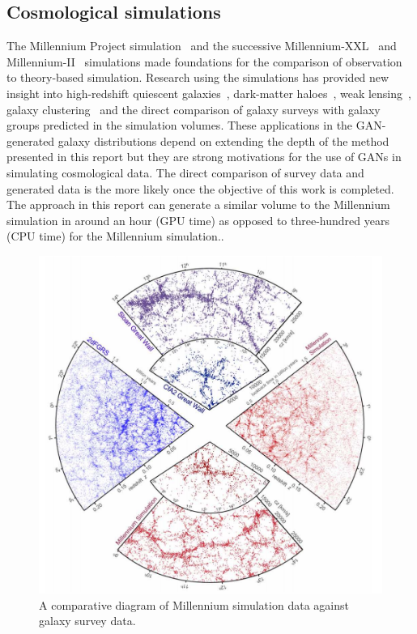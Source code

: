 \documentclass[twocolumn]{article}
\numberwithin{equation}{section}
\begin{document}
\subsection{Cosmological simulations}
The Millennium Project simulation~\cite{millsim} and the successive Millennium-XXL~\cite{millxxlsim} and 
Millennium-II~\cite{mill2sim} simulations made foundations for the comparison of observation to theory-based simulation. 
Research using the simulations has provided new insight into high-redshift quiescent galaxies~\cite{mill_quiescent},
dark-matter haloes~\cite{mill_dm_haloes}, weak lensing~\cite{mill_weak_lensing}, galaxy clustering~\cite{mill_gal_clustering} 
and the direct comparison of galaxy surveys with galaxy groups predicted in the simulation volumes\cite{mill_sdss}. 
These applications in the GAN-generated galaxy distributions depend on extending the depth of the method presented in 
this report but they are strong motivations for the use of GANs in simulating cosmological data. The direct comparison 
of survey data and generated data is the more likely once the objective of this work is completed. The approach in this 
report can generate a similar volume to the Millennium simulation in around an hour (GPU time) as opposed to 
three-hundred years (CPU time) for the Millennium simulation.\footnotemark.


\begin{figure}[hbt!]
\includegraphics[width=\columnwidth]{figures/diagrams/mill_catalog_comparison.png}
\centering
\caption[]{A comparative diagram of Millennium simulation data against galaxy survey data\protect\footnotemark.}
\label{fig:gal_catalogs}
\end{figure}
\end{document}
